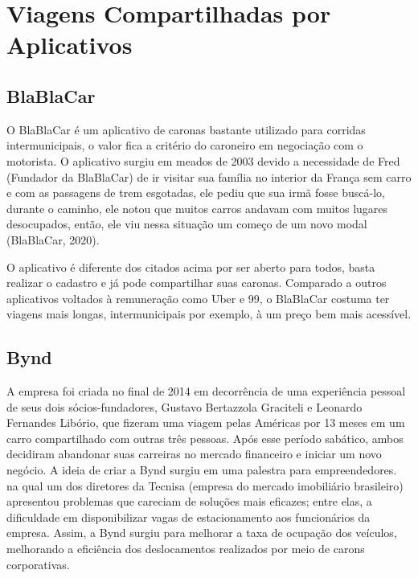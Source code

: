 
\section{Viagens Compartilhadas por Aplicativos}
\subsection{BlaBlaCar}

O BlaBlaCar é um aplicativo de caronas bastante utilizado para corridas intermunicipais, o valor fica a critério do caroneiro em negociação com o motorista. O aplicativo surgiu em meados de 2003 devido a necessidade de Fred (Fundador da BlaBlaCar) de ir visitar sua família no interior da França sem carro e com as passagens de trem esgotadas, ele pediu que sua irmã fosse buscá-lo, durante o caminho, ele notou que muitos carros andavam com muitos lugares desocupados, então, ele viu nessa situação um começo de um novo modal (BlaBlaCar, 2020).

O aplicativo é diferente dos citados acima por ser aberto para todos, basta realizar o cadastro e já pode compartilhar suas caronas. Comparado a outros aplicativos voltados à remuneração como Uber e 99, o BlaBlaCar costuma ter viagens mais longas, intermunicipais por exemplo, à um preço bem mais acessível. %

\subsection{Bynd}

A empresa foi criada no final de 2014 em decorrência de uma experiência pessoal de seus dois sócios-fundadores, Gustavo Bertazzola Graciteli e Leonardo Fernandes Libório, que fizeram uma viagem pelas Américas por 13 meses em um carro compartilhado com outras três pessoas. Após esse período sabático, ambos decidiram abandonar suas carreiras no mercado financeiro e iniciar um novo negócio. A ideia de criar a Bynd surgiu em uma palestra para empreendedores. na qual um dos diretores da Tecnisa (empresa do mercado imobiliário brasileiro) apresentou problemas que careciam de soluções mais eficazes; entre elas, a dificuldade em disponibilizar vagas de estacionamento aos funcionários da empresa. Assim, a Bynd surgiu para melhorar a taxa de ocupação dos veículos, melhorando a eficiência dos deslocamentos realizados por meio de carons corporativas.

